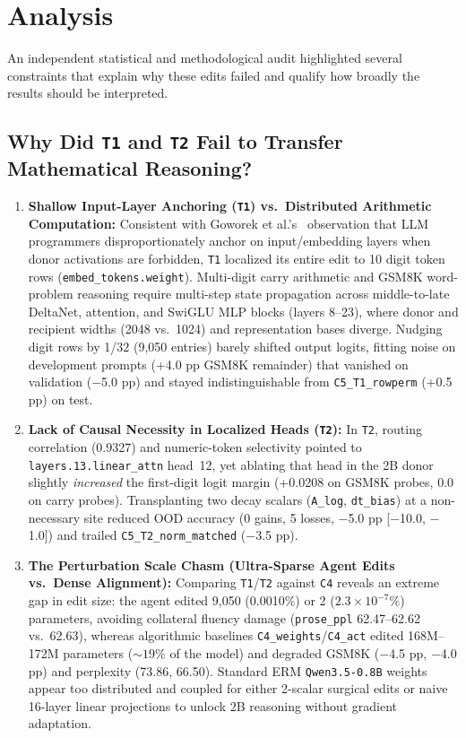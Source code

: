\documentclass[11pt]{article}
\newcommand{\codepath}[1]{\texttt{\nolinkurl{#1}}}
\begin{document}
\section{Analysis}

An independent statistical and methodological audit highlighted several constraints that explain why these edits failed and qualify how broadly the results should be interpreted.

\subsection{Why Did \texttt{T1} and \texttt{T2} Fail to Transfer Mathematical Reasoning?}

\begin{enumerate}
\item \textbf{Shallow Input-Layer Anchoring (\texttt{T1}) vs.\ Distributed Arithmetic Computation:} Consistent with Goworek et al.'s~\cite{goworek2026replicating} observation that LLM programmers disproportionately anchor on input/embedding layers when donor activations are forbidden, \texttt{T1} localized its entire edit to 10 digit token rows (\codepath{embed_tokens.weight}). Multi-digit carry arithmetic and GSM8K word-problem reasoning require multi-step state propagation across middle-to-late DeltaNet, attention, and SwiGLU MLP blocks (layers 8--23), where donor and recipient widths (2048 vs.\ 1024) and representation bases diverge. Nudging digit rows by 1/32 (9,050 entries) barely shifted output logits, fitting noise on development prompts (+4.0 pp GSM8K remainder) that vanished on validation ($-$5.0 pp) and stayed indistinguishable from \texttt{C5\_T1\_rowperm} (+0.5 pp) on test.
\item \textbf{Lack of Causal Necessity in Localized Heads (\texttt{T2}):} In \texttt{T2}, routing correlation (0.9327) and numeric-token selectivity pointed to \codepath{layers.13.linear_attn} head~12, yet ablating that head in the 2B donor slightly \emph{increased} the first-digit logit margin (+0.0208 on GSM8K probes, 0.0 on carry probes). Transplanting two decay scalars (\texttt{A\_log}, \texttt{dt\_bias}) at a non-necessary site reduced OOD accuracy (0 gains, 5 losses, $-$5.0 pp [$-$10.0, $-$1.0]) and trailed \texttt{C5\_T2\_norm\_matched} ($-$3.5 pp).
\item \textbf{The Perturbation Scale Chasm (Ultra-Sparse Agent Edits vs.\ Dense Alignment):} Comparing \texttt{T1}/\texttt{T2} against \texttt{C4} reveals an extreme gap in edit size: the agent edited 9,050 (0.0010\%) or 2 ($2.3\times 10^{-7}$\%) parameters, avoiding collateral fluency damage (\texttt{prose\_ppl} 62.47--62.62 vs.\ 62.63), whereas algorithmic baselines \texttt{C4\_weights}/\texttt{C4\_act} edited 168M--172M parameters ($\sim 19\%$ of the model) and degraded GSM8K ($-$4.5 pp, $-$4.0 pp) and perplexity (73.86, 66.50). Standard ERM \texttt{Qwen3.5-0.8B} weights~\cite{ropinski2026editready} appear too distributed and coupled for either 2-scalar surgical edits or naive 16-layer linear projections to unlock 2B reasoning without gradient adaptation.
\end{enumerate}
\end{document}
